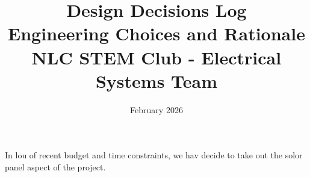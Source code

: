 \documentclass[11pt,letterpaper]{article}
\title{\Huge\textbf{Design Decisions Log}\\
\Large Engineering Choices and Rationale\\
\large NLC STEM Club - Electrical Systems Team}
\author{February 2026}
\date{}
\begin{document}
\maketitle
\thispagestyle{empty}
\newpage
In lou of recent budget and time constraints, we hav decide to take out the solor panel aspect of the project.\par
\end{document}
